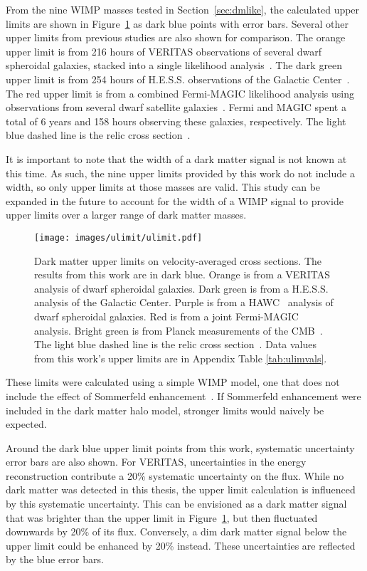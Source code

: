 From the nine WIMP masses tested in Section~\ref{sec:dmlike}, the calculated upper limits are shown in Figure~\ref{fig:ulim} as dark blue points with error bars.
Several other upper limits from previous studies are also shown for comparison.
The orange upper limit is from 216 hours of VERITAS observations of several dwarf spheroidal galaxies, stacked into a single likelihood analysis~\cite{veritas_dm_limit}.
The dark green upper limit is from 254 hours of H.E.S.S. observations of the Galactic Center~\cite{hessgcul}.
The red upper limit is from a combined Fermi-MAGIC likelihood analysis using observations from several dwarf satellite galaxies~\cite{fermagicul}.
Fermi and MAGIC spent a total of 6 years and 158 hours observing these galaxies, respectively.
The light blue dashed line is the relic cross section~\cite{updatedWIMPRelicCrossSection}.

It is important to note that the width of a dark matter signal is not known at this time.
As such, the nine upper limits provided by this work do not include a width, so only upper limits at those masses are valid.
This study can be expanded in the future to account for the width of a WIMP signal to provide upper limits over a larger range of dark matter masses.

\begin{figure}[tb]
  \centering
  \texttt{[image: images/ulimit/ulimit.pdf]}
  \caption[Dark Matter Upper Limit]{
    Dark matter upper limits on velocity-averaged cross sections.
    The results from this work are in dark blue.
    Orange is from a VERITAS~\cite{veritas_dm_limit} analysis of dwarf spheroidal galaxies.
    Dark green is from a H.E.S.S.~\cite{hess_dm_limit} analysis of the Galactic Center.
    Purple is from a HAWC~\cite{hawc_dm_limit} analysis of dwarf spheroidal galaxies.
    Red is from a joint Fermi-MAGIC~\cite{fermagicul} analysis.
    Bright green is from Planck measurements of the CMB~\cite{planck_dm_limit}.
    The light blue dashed line is the relic cross section~\cite{updatedWIMPRelicCrossSection}.
    Data values from this work's upper limits are in Appendix Table \ref{tab:ulimvals}.
  }
  \label{fig:ulim}
\end{figure}

These limits were calculated using a simple WIMP model, one that does not include the effect of Sommerfeld enhancement~\cite{sommerfeld}.
If Sommerfeld enhancement were included in the dark matter halo model, stronger limits would naively be expected.

Around the dark blue upper limit points from this work, systematic uncertainty error bars are also shown.
For VERITAS, uncertainties in the energy reconstruction contribute a \nicetilde{}20\% systematic uncertainty on the flux.
While no dark matter was detected in this thesis, the upper limit calculation is influenced by this systematic uncertainty.
This can be envisioned as a dark matter signal that was brighter than the upper limit in Figure~\ref{fig:ulim}, but then fluctuated downwards by 20\% of its flux.
Conversely, a dim dark matter signal below the upper limit could be enhanced by 20\% instead.
These uncertainties are reflected by the blue error bars.


